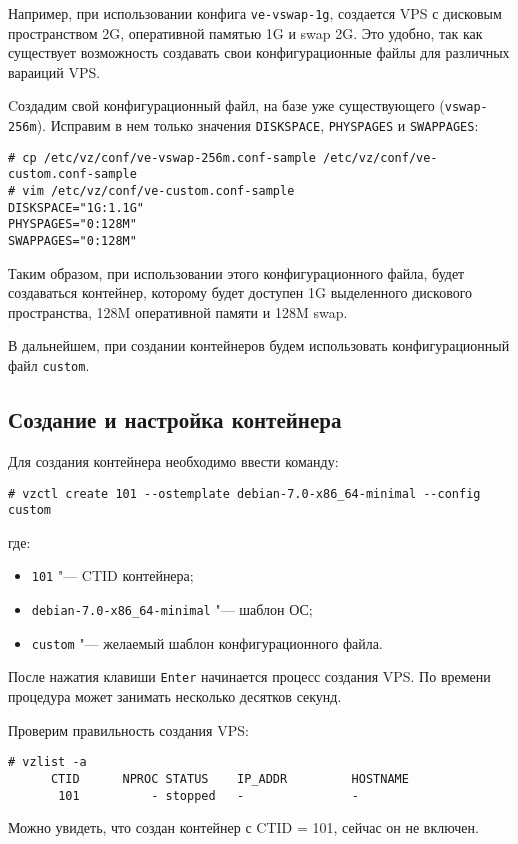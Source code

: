 Например, при использовании конфига \texttt{ve-vswap-1g}, создается VPS с дисковым пространством 2G, оперативной памятью 1G и swap 2G.
Это удобно, так как существует возможность создавать свои конфигурационные файлы для различных вараиций VPS.

Cоздадим свой конфигурационный файл, на базе уже существующего (\texttt{vswap-256m}).
Исправим в нем только значения \texttt{DISKSPACE}, \texttt{PHYSPAGES} и \texttt{SWAPPAGES}:
\begin{lstlisting}
# cp /etc/vz/conf/ve-vswap-256m.conf-sample /etc/vz/conf/ve-custom.conf-sample
# vim /etc/vz/conf/ve-custom.conf-sample
DISKSPACE="1G:1.1G"
PHYSPAGES="0:128M"
SWAPPAGES="0:128M"
\end{lstlisting}

Таким образом, при использовании этого конфигурационного файла, будет создаваться контейнер, которому будет доступен 1G выделенного дискового пространства, 128M оперативной памяти и 128M swap.

В дальнейшем, при создании контейнеров будем использовать конфигурационный файл \texttt{custom}.

\subsection{Создание и настройка контейнера}
Для создания контейнера необходимо ввести команду:
\begin{lstlisting}
# vzctl create 101 --ostemplate debian-7.0-x86_64-minimal --config custom
\end{lstlisting}
где:
\begin{itemize}
    \item \texttt{101} "--- CTID контейнера;
    \item \texttt{debian-7.0-x86\_64-minimal} "--- шаблон ОС;
    \item \texttt{custom} "--- желаемый шаблон конфигурационного файла.
\end{itemize}

После нажатия клавиши \texttt{Enter} начинается процесс создания VPS. 
По времени процедура может занимать несколько десятков секунд.

Проверим правильность создания VPS:
\begin{lstlisting}
# vzlist -a
      CTID      NPROC STATUS    IP_ADDR         HOSTNAME
       101          - stopped   -               -
\end{lstlisting}

Можно увидеть, что создан контейнер с CTID = 101, сейчас он не включен.

